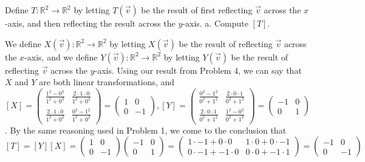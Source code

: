 \documentclass[12pt]{article}
\newenvironment{problem}[2][Problem]
{
	\begin{trivlist} 
		\item[\hskip \labelsep {\bfseries #1 #2:}]
	}
{
	\end{trivlist}
	}
\newenvironment{solution}[1][Solution]
{
	\begin{trivlist} 
		\item[\hskip \labelsep {\itshape #1:}]
	}
	{
	\end{trivlist}
}
\begin{document}
\newpage
\begin{problem}{5}
Define $T:\mathbb{R}^2 \to \mathbb{R}^2$ by letting $T(\vec{v})$ be the result of first reflecting $\vec{v}$ across the $x$-axis, and then reflecting the result across the $y$-axis.
\noindent
\newline
\newline
a. Compute $[T]$.
\begin{solution}
We define $X(\vec{v}):\mathbb{R}^2 \to \mathbb{R}^2$ by letting $X(\vec{v})$ be the result of reflecting $\vec{v}$ across the $x$-axis, and we define $Y(\vec{v}):\mathbb{R}^2 \to \mathbb{R}^2$ by letting $Y(\vec{v})$ be the result of reflecting $\vec{v}$ across the $y$-axis. 
Using our result from Problem 4, we can say that $X$ and $Y$ are both linear transformations, and $[X] = \begin{pmatrix} \frac{1^2 - 0^2}{1^2 + 0^2}  &  \frac{2\cdot 1\cdot 0}{1^2 + 0^2}  \\  \frac{2\cdot 1 \cdot 0}{1^2 + 0^2}  & \frac{0^2 - 1^2}{1^2 + 0^2} \end{pmatrix} =\begin{pmatrix} 1  &  0  \\  0 & -1 \end{pmatrix}, [Y]=\begin{pmatrix} \frac{0^2 - 1^2}{0^2 + 1^2}  &  \frac{2\cdot 0\cdot 1}{0^2 + 1^2}  \\  \frac{2\cdot 0 \cdot 1}{0^2 + 1^2}  & \frac{1^2 - 0^2}{0^2 + 1^2} \end{pmatrix} = \begin{pmatrix} -1  &  0  \\  0 & 1 \end{pmatrix}$. 
By the same reasoning used in Problem 1, we come to the conclusion that $[T]=[Y][X] = \begin{pmatrix} 1  &  0  \\  0 & -1 \end{pmatrix} \begin{pmatrix} -1  &  0  \\  0 & 1 \end{pmatrix} = \begin{pmatrix} 1\cdot -1 + 0\cdot 0 &  1\cdot 0 + 0\cdot -1  \\  0\cdot -1 + -1 \cdot 0 & 0\cdot 0 + -1\cdot 1 \end{pmatrix} = \begin{pmatrix} -1 & 0\\ 0&-1\end{pmatrix}$
\end{solution}


\end{problem}
\end{document}
